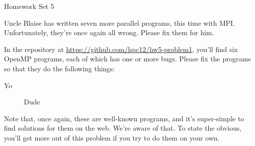 \documentclass[11pt]{article}
\begin{document}
%
{Homework Set 5}


\bigskip
{}

Uncle Blaise has written seven more parallel programs, this time with
MPI. Unfortunately, they're once again all wrong. Please fix them for
him.

In the repository at \url{https://github.com/hpc12/hw5-problem1},
you'll find six OpenMP programs, each of which has one or more bugs.
Please fix the programs so that they do the following things:

\begin{description}
\item[Yo] Dude
\end{description}

Note that, once again, these are well-known programs, and it's
super-simple to find solutions for them on the web. We're aware of
that. To state the obvious, you'll get more out of this problem if you
try to do them on your own.
\end{document}
